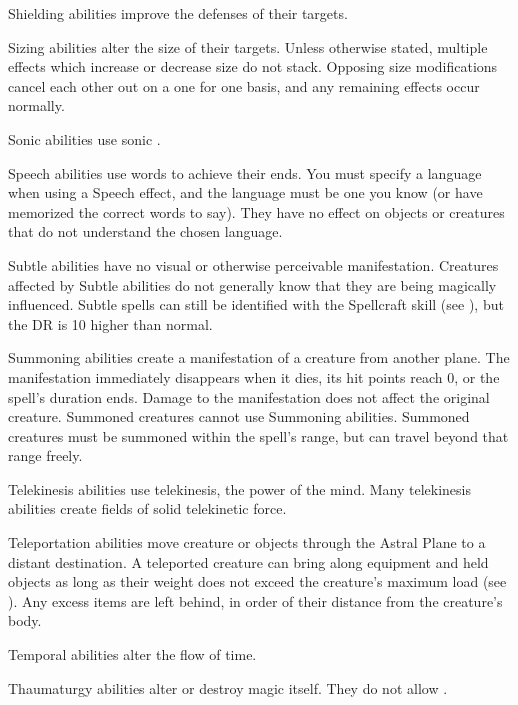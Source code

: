      Shielding abilities improve the defenses of their targets.

     Sizing abilities alter the size of their targets. Unless otherwise stated, multiple effects which increase or decrease size do not stack. Opposing size modifications cancel each other out on a one for one basis, and any remaining effects occur normally.

     Sonic abilities use sonic .

     Speech abilities use words to achieve their ends. You must specify a language when using a Speech effect, and the language must be one you know (or have memorized the correct words to say). They have no effect on objects or creatures that do not understand the chosen language.

     Subtle abilities have no visual or otherwise perceivable manifestation. Creatures affected by Subtle abilities do not generally know that they are being magically influenced. Subtle spells can still be identified with the Spellcraft skill (see ), but the DR is 10 higher than normal.

     Summoning abilities create a manifestation of a creature from another plane. The manifestation immediately disappears when it dies, its hit points reach 0, or the spell's duration ends. Damage to the manifestation does not affect the original creature. Summoned creatures cannot use Summoning abilities. Summoned creatures must be summoned within the spell's range, but can travel beyond that range freely.

     Telekinesis abilities use telekinesis, the power of the mind. Many telekinesis abilities create fields of solid telekinetic force.

     Teleportation abilities move creature or objects through the Astral Plane to a distant destination. A teleported creature can bring along equipment and held objects as long as their weight does not exceed the creature's maximum load (see ). Any excess items are left behind, in order of their distance from the creature's body.

     Temporal abilities alter the flow of time.

     Thaumaturgy abilities alter or destroy magic itself. They do not allow .

